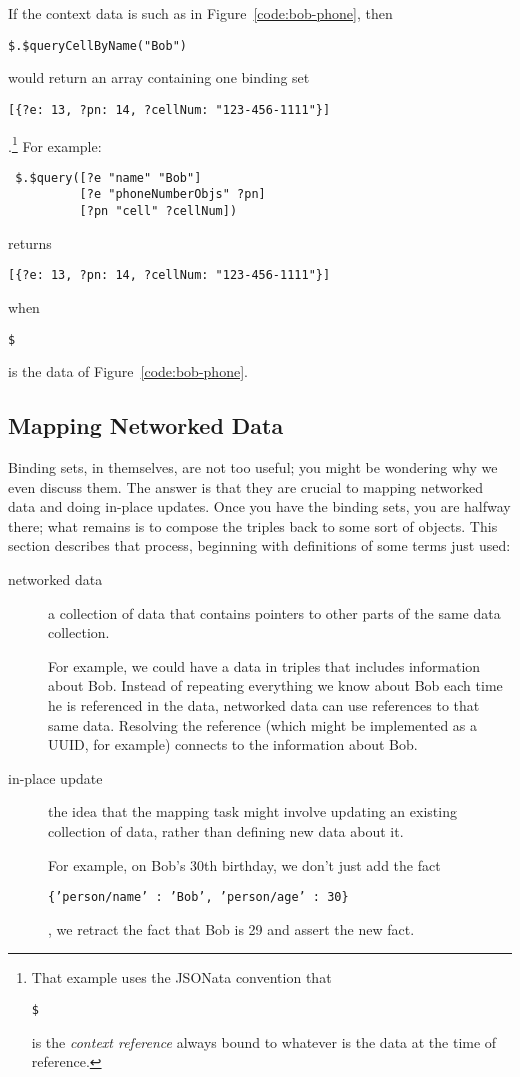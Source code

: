 \documentclass[9pt,letterpaper]{article}
\newcommand{\stt}[1]{\begin{footnotesize}\texttt{#1}\end{footnotesize}}
\begin{document}
If the context data is such as in Figure~\ref{code:bob-phone}, then \stt{\$.\$queryCellByName("Bob")} would return an array containing one binding set \stt{[\{?e: 13, ?pn: 14, ?cellNum: "123-456-1111"\}]}.\footnote{That
example uses the JSONata convention that \stt{\$} is the \textit{context reference} always bound to whatever is the data at the time of reference.}
For example:

\begin{lstlisting}
 $.$query([?e "name" "Bob"]
          [?e "phoneNumberObjs" ?pn]
          [?pn "cell" ?cellNum])
\end{lstlisting}

returns \stt{[\{?e: 13, ?pn: 14, ?cellNum: "123-456-1111"\}]} when \stt{\$} is the data of Figure~\ref{code:bob-phone}.

\subsection{Mapping  Networked Data}

Binding sets, in themselves, are not too useful; you might be wondering why we even discuss them.
The answer is that they are crucial to mapping networked data and doing in-place updates.
Once you have the binding sets, you are halfway there; what remains is to compose the triples back to some sort of objects.
This section describes that process, beginning with definitions of some terms just used:

\begin{description}
\item[networked data] a collection of data that contains pointers to other parts of the same data collection.

  For example, we could have a data in triples that includes information about Bob.
  Instead of repeating everything we know about Bob each time he is referenced in the data,
  networked data can use references to that same data.
  Resolving the reference (which might be implemented as a UUID, for example) connects to the information about Bob.
\item[in-place update] the idea that the mapping task might involve updating an existing collection of data, rather than
  defining new data about it.

  For example, on Bob's 30th birthday, we don't just add the fact \stt{\{'person/name' : 'Bob', 'person/age' : 30\}}, we
  retract the fact that Bob is 29 and assert the new fact.
\end{description}
\end{document}
